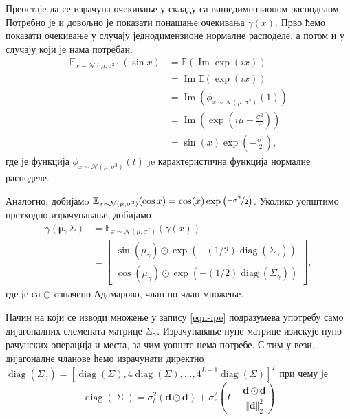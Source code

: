 \documentclass[12pt, a4paper, twoside]{book}
\numberwithin{equation}{chapter}
\numberwithin{theorem}{section}
\numberwithin{definition}{section}
\numberwithin{definitionChapter}{chapter}
\begin{document}
Преостаје да се израчуна очекивање у складу са вишедимензионом расподелом. Потребно је и довољно је показати
понашање очекивања $\gamma(x)$. Прво ћемо показати очекивање у случају једнодимензионе нормалне расподеле, а
потом и у случају који је нама потребан.
\begin{equation}
	\begin{split}
		\mathbb{E}_{x \sim \mathcal{N}(\mu, \sigma^2)}(\sin x) & = \mathbb{E}(\operatorname{Im}\exp(ix)) \\
			& = \operatorname{Im}\mathbb{E}(\exp(ix)) \\
			& = \operatorname{Im}(\phi_{x \sim \mathcal{N}(\mu, \sigma^2)}(1)) \\
			& = \operatorname{Im}\left(\exp\left(i\mu - \frac{\sigma^2}{2}\right)\right) \\
			& = \sin(x)\exp\left(-\frac{\sigma^2}{2}\right),
	\end{split}
\end{equation}
где је функција $\phi_{x \sim \mathcal{N}(\mu, \sigma^2)}(t)$ je карактеристична функција нормалне расподеле.

Аналогно, добијамo $\mathbb{E}_{x \sim \mathcal{N}(\mu, \sigma^2)}(\cos x) = \cos(x)\exp\left(\nicefrac{-\sigma^2}{2}\right)$.
Уколико уопштимо претходно израчунавање, добијамо
\begin{equation}
	\begin{split}
		\gamma(\boldsymbol{\mu}, \Sigma) & = \mathbb{E}_{x \sim \mathcal{N}(\mu, \sigma^2)}(\gamma(x)) \\
			& =
			\begin{bmatrix}
				\sin(\mu_\gamma) \odot \exp(-(1/2)\operatorname{diag}(\Sigma_\gamma)) \\
				\cos(\mu_\gamma) \odot \exp(-(1/2)\operatorname{diag}(\Sigma_\gamma))
			\end{bmatrix},
		\label{eqn-ipe}
	\end{split}
\end{equation}
где је са $\odot$ oзначено Адамарово, члан-по-члан множење.

Начин на који се изводи множење у запису \ref{eqn-ipe} подразумева употребу само дијагоналних елемената матрице
$\Sigma_\gamma$. Израчунавање пуне матрице изискује пуно рачунских операција и места, за чим уопште нема потребе.
С тим у вези, дијагоналне чланове ћемо израчунати директно $\operatorname{diag}(\Sigma_\gamma)
= \left[\operatorname{diag}(\Sigma), 4\operatorname{diag}(\Sigma), ..., 4^{L-1}\operatorname{diag}(\Sigma)\right]^T$ при чему је
\begin{equation}
	\operatorname{diag}(\operatorname{\Sigma}) = \sigma_t^2(\mathbf{d}\odot\mathbf{d}) +
		\sigma_r^2\left(I - \frac{\mathbf{d} \odot \mathbf{d}}{\Vert\mathbf{d}\Vert_2^2}\right)
\end{equation}
\end{document}
